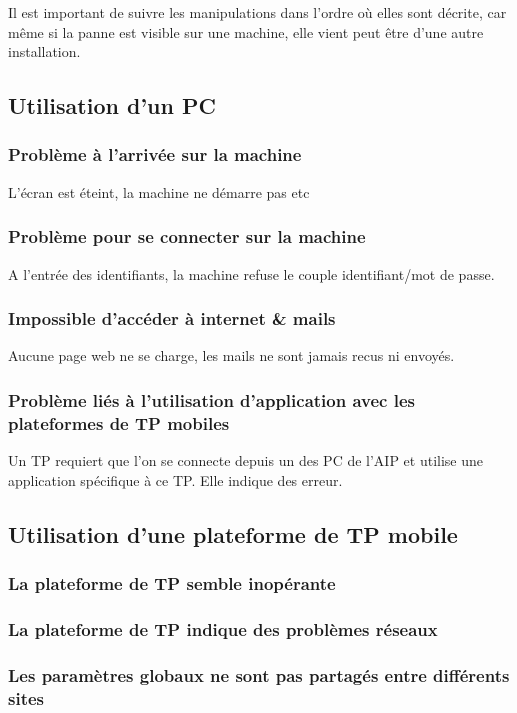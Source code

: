 \documentclass[a4paper]{article}
\begin{document}
Il est important de suivre les manipulations dans l'ordre où elles sont décrite, car même si la panne est visible sur une machine, elle vient peut être d'une autre installation.


\subsection{Utilisation d'un PC}
\subsubsection{Problème à l'arrivée sur la machine}
L'écran est éteint, la machine ne démarre pas etc

\subsubsection{Problème pour se connecter sur la machine}
A l'entrée des identifiants, la machine refuse le couple identifiant/mot de passe.

\subsubsection{Impossible d'accéder à internet \& mails}
Aucune page web ne se charge, les mails ne sont jamais recus ni envoyés.

\subsubsection{Problème liés à l'utilisation d'application avec les plateformes de TP mobiles}
Un TP requiert que l'on se connecte depuis un des PC de l'AIP et utilise une application spécifique à ce TP. Elle indique des erreur.
		
\subsection{Utilisation d'une plateforme de TP mobile}
\subsubsection{La plateforme de TP semble inopérante}

\subsubsection{La plateforme de TP indique des problèmes réseaux}

\subsubsection{Les paramètres globaux ne sont pas partagés entre différents sites}
\end{document}

